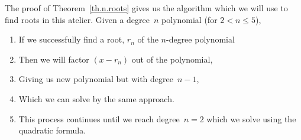 The proof of Theorem~\ref{th.n.roots} gives us the algorithm which we will use to find
roots in this atelier.  Given a degree~$n$ polynomial (for $2<n\leq5$),
\begin{enumerate}
\item If we successfully find a root, $r_n$ of the $n$-degree polynomial
\item Then we will factor  $(x-r_n)$ out of the polynomial,
\item Giving us new polynomial but with degree~$n-1$,
\item Which we can solve by the same approach.  
\item This process continues until we reach degree~$n=2$ which we
  solve using the quadratic formula.

\end{enumerate}


